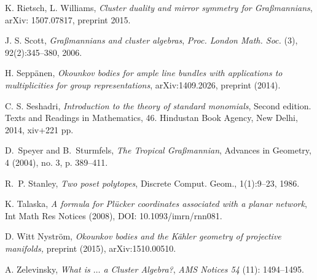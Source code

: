 \documentclass{emsprocart}
\theoremstyle{definition}
\begin{document}
\begin{thebibliography}{7}
K. Rietsch, L. Williams, \textit{Cluster duality and mirror symmetry for Gra\ss mannians}, arXiv: 1507.07817, preprint 2015.

J. S. Scott, \textit{Gra\ss mannians and cluster algebras}, {\it Proc. London Math. Soc.} (3), 92(2):345--380, 2006.

H. Sepp\"anen, \textit{Okounkov bodies for ample line bundles with applications to multiplicities for group representations},
arXiv:1409.2026, preprint (2014).

C. S. Seshadri,
\textit{Introduction to the theory of standard monomials},
Second edition. Texts and Readings in Mathematics, 46. Hindustan Book Agency, New Delhi, 2014, xiv+221 pp.

D.~Speyer and B.~Sturmfels,
{\it The Tropical Gra\ss mannian},
Advances in Geometry, 4 (2004), no. 3, p. 389--411.

R.~P. Stanley,
\emph{Two poset polytopes},
{ Discrete Comput. Geom.}, 1(1):9--23, 1986.

 K. Talaska,
\textit{A formula for Pl\"ucker coordinates associated with a planar network}, Int Math Res Notices (2008), DOI: 10.1093/imrn/rnn081.

D. Witt Nystr\"om,
\emph{Okounkov bodies and the K\"ahler geometry of projective manifolds,}
preprint (2015), arXiv:1510.00510.

A. Zelevinsky, \textit{What is $\ldots$ a Cluster Algebra?}, {\it AMS Notices 54} (11): 1494--1495.

\end{thebibliography}
\end{document}

